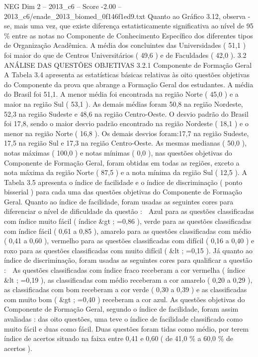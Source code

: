 \begin{textsample}{NEG Dim 2 – 2013\_c6 – Score -2.00 – 2013\_c6/enade\_2013\_biomed\_0f146f1ed9.txt}
Quanto ao Gráfico 3.12, observa -se, mais uma vez, que existe diferença estatisticamente significativa ao nível de 95 \% entre as notas no Componente de Conhecimento Específico dos diferentes tipos de Organização Acadêmica.
A média dos concluintes das Universidades ( 51,1 ) foi maior do que de Centros Universitários ( 49,6 ) e de Faculdades ( 42,0 ). 3.2 ANÁLISE DAS QUESTÕES OBJETIVAS 3.2.1 Componente de Formação Geral A Tabela 3.4 apresenta as estatísticas básicas relativas às oito questões objetivas do Componente da prova que abrange a Formação Geral dos estudantes.
A média do Brasil foi 51,1.
A menor média foi encontrada na região Norte ( 45,0 ) e a maior na região Sul ( 53,1 ).
As demais médias foram 50,8 na região Nordeste, 52,3 na região Sudeste e 48,6 na região Centro-Oeste.
O desvio padrão do Brasil foi 17,8, sendo o maior desvio padrão encontrado na região Nordeste ( 18,1 ) e o menor na região Norte ( 16,8 ).
Os demais desvios foram:17,7 na região Sudeste, 17,5 na região Sul e 17,3 na região Centro-Oeste.
As mesmas medianas ( 50,0 ), notas máximas ( 100,0 ) e notas mínimas ( 0,0 ), nas questões objetivas do Componente de Formação Geral, foram obtidas em todas as regiões, exceto a nota máxima da região Norte ( 87,5 ) e a nota mínima da região Sul ( 12,5 ).
A Tabela 3.5 apresenta o índice de facilidade e o índice de discriminação ( ponto bisserial ) para cada uma das questões objetivas do Componente de Formação Geral.
Quanto ao índice de facilidade, foram usadas as seguintes cores para diferenciar o nível de dificuldade da questão :  Azul para as questões classificadas com índice muito fácil ( índice \&gt ; =0,86 ), verde para as questões classificadas com índice fácil ( 0,61 a 0,85 ), amarelo para as questões classificadas com médio ( 0,41 a 0,60 ), vermelho para as questões classificadas com difícil ( 0,16 a 0,40 ) e roxo para as questões classificadas com muito difícil ( \&lt ; =0,15 ).
Já quanto ao índice de discriminação, foram usadas as seguintes cores para qualificar a questão :  As questões classificadas com índice fraco receberam a cor vermelha ( índice \&lt ; =0,19 ), as classificadas com médio receberam a cor amarelo ( 0,20 a 0,29 ), as classificadas com bom receberam a cor verde ( 0,30 a 0,39 ) e as classificadas com muito bom ( \&gt ; =0,40 ) receberam a cor azul.
As questões objetivas do Componente de Formação Geral, segundo o índice de facilidade, foram assim avaliadas : das oito questões, uma teve o índice de facilidade classificado como muito fácil e duas como fácil.
Duas questões foram tidas como médio, por terem índice de acertos situado na faixa entre 0,41 e 0,60 ( de 41,0 \% a 60,0 \% de acertos ).

\end{textsample}
